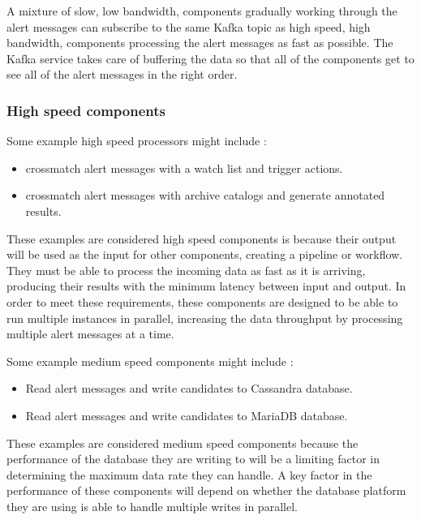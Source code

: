 \documentclass{article}
\newcommand{\kafka} {Kafka\xspace}
\newcommand{\cassandra} {Cassandra\xspace}
\newcommand{\mariadb} {MariaDB\xspace}
\newcommand{\crossmatch} {crossmatch\xspace}
\newcommand{\phasea} {phase A\xspace}
\newcommand{\lsstuk} {LSST:UK\xspace}
\begin{document}
A mixture of slow, low bandwidth, components gradually working through the alert messages can subscribe to the same \kafka topic as high speed, high bandwidth, components processing the alert messages as fast as possible. The \kafka service takes care of buffering the data so that all of the components get to see all of the alert messages in the right order.

\subsubsection{High speed components}
\label{stage-2.high-speed.components}

Some example high speed processors might include :
\begin{itemize}
  \item \crossmatch alert messages with a watch list and trigger actions.
  \item \crossmatch alert messages with archive catalogs and generate annotated results.
\end{itemize}

These examples are considered high speed components is because their output will be used as the input for other components, creating a pipeline or workflow.
They must be able to process the incoming data as fast as it is arriving, producing their results with the minimum latency between input and output.
In order to meet these requirements, these components are designed to be able to run multiple instances in parallel, increasing the data throughput by processing multiple alert messages at a time.

Some example medium speed components might include :
\begin{itemize}
  \item Read alert messages and write candidates to \cassandra database.
  \item Read alert messages and write candidates to \mariadb database.
\end{itemize}

These examples are considered medium speed components because the performance of the database they are writing to will be a limiting factor in determining the maximum data rate they can handle. A key factor in the performance of these components will depend on whether the database platform they are using is able to handle multiple writes in parallel.

\end{document}
